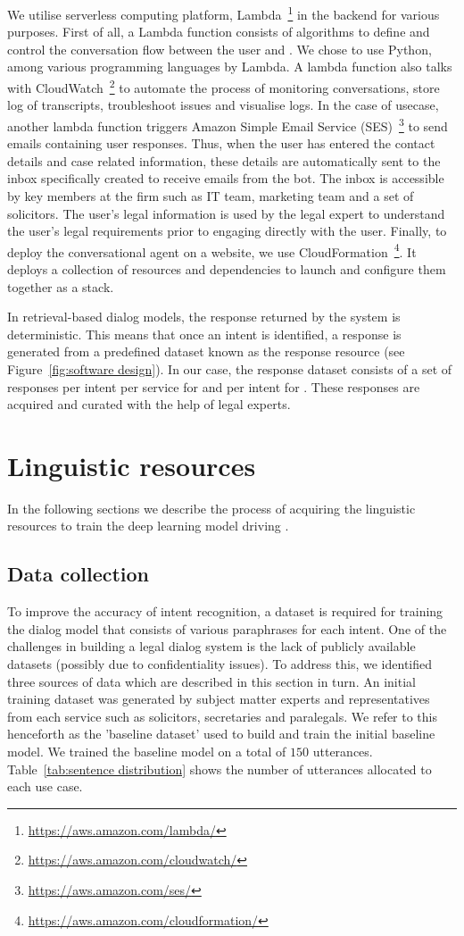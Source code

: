 \documentclass[runningheads]{llncs}
\begin{document}
We utilise \aws serverless computing platform, \aws Lambda~\footnote{\url{https://aws.amazon.com/lambda/}} in the backend for various purposes. First of all, a Lambda function consists of algorithms to define and control the conversation flow between the user and \lex. We chose to use Python, among various programming languages by \aws Lambda. 
A lambda function also talks with CloudWatch~\footnote{\url{https://aws.amazon.com/cloudwatch/}} to automate the process of monitoring conversations, store log of transcripts, troubleshoot issues and visualise logs.
In the case of \ff usecase, another lambda function triggers \aws Amazon Simple Email Service (SES)~\footnote{\url{https://aws.amazon.com/ses/}} to send emails containing user responses. Thus, when the user has entered the contact details and case related information, these details are automatically sent to the inbox specifically created to receive emails from the bot. The inbox is accessible by key members at the firm such as IT team, marketing team and a set of solicitors. The user's legal information is used by the legal expert to understand the user’s legal requirements prior to engaging directly with the user.
Finally, to deploy the conversational agent on a website, we use \aws CloudFormation~\footnote{\url{https://aws.amazon.com/cloudformation/}}. It deploys a collection of \aws resources and dependencies to launch and configure them together as a stack.

In retrieval-based dialog models, the response returned by the system is deterministic. This means that once an intent is identified, a response is generated from a predefined dataset known as the response resource (see Figure~\ref{fig:software design}).
In our case, the response dataset consists of a set of responses per intent per service for \faq and per intent for \ff. These responses are acquired and curated with the help of legal experts.


\section{Linguistic resources}\label{sec:ling-res}
In the following sections we describe the process of acquiring the linguistic resources to train the deep learning model driving \lex.

\subsection{Data collection}
To improve the accuracy of intent recognition, a dataset is required for training the dialog model that consists of various paraphrases for each intent. One of the challenges in building a legal dialog system is the lack of publicly available datasets (possibly due to confidentiality issues). 
To address this, we identified three sources of data which are described in this section in turn. 
An initial training dataset was generated by subject matter experts and representatives from each service such as solicitors, secretaries and paralegals. We refer to this henceforth as the 'baseline dataset' used to build and train the initial baseline model. We trained the baseline model on a total of $150$ utterances. Table~\ref{tab:sentence distribution} shows the number of utterances allocated to each use case. 
\end{document}
